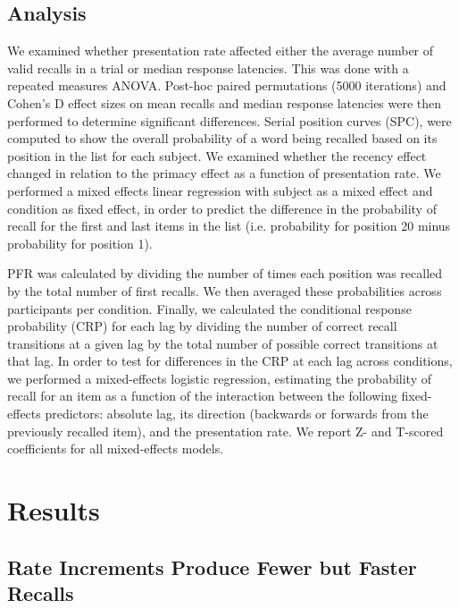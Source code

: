 \documentclass[10pt,letterpaper]{article}
\begin{document}
\subsection{Analysis}

We examined whether presentation rate affected either the average number of valid recalls in a trial or median response latencies. This was done with a repeated measures ANOVA. Post-hoc paired permutations (5000 iterations) and Cohen's D effect sizes on mean recalls and median response latencies were then performed to determine significant differences. Serial position curves (SPC), were computed to show the overall probability of a word being recalled based on its position in the list for each subject. We examined whether the recency effect changed in relation to the primacy effect as a function of presentation rate. We performed a mixed effects linear regression with subject as a mixed effect and condition as fixed effect, in order to predict the difference in the probability of recall for the first and last items in the list (i.e. probability for position 20 minus probability for position 1). 

PFR was calculated by dividing the number of times each position was recalled by the total number of first recalls. We then averaged these probabilities across participants per condition. Finally, we calculated the conditional response probability (CRP) for each lag by dividing the number of correct recall transitions at a given lag by the total number of possible correct transitions at that lag. In order to test for differences in the CRP at each lag across conditions, we performed a mixed-effects logistic regression, estimating the probability of recall for an item as a function of the interaction between the following fixed-effects predictors: absolute lag, its direction (backwards or forwards from the previously recalled item), and the presentation rate. We report Z- and T-scored coefficients for all mixed-effects models.

\section{Results}

\subsection{Rate Increments Produce Fewer but Faster Recalls}
\end{document}

